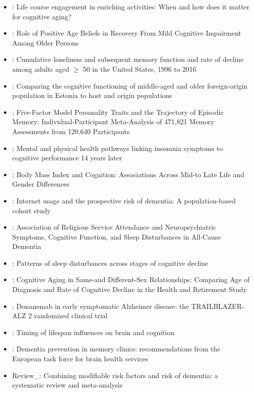 \documentclass[12pt]{article}
\begin{document}
\begin{itemize}
\begin{itemize}
        \item \cite{frank2023life}: Life course engagement in enriching activities: When and how does it matter for cognitive aging?
        \item \cite{levy2023role}: Role of Positive Age Beliefs in Recovery From Mild Cognitive Impairment Among Older Persons
        \item \cite{yu2023cumulative}: Cumulative loneliness and subsequent memory function and rate of decline among adults aged $\geq$ 50 in the United States, 1996 to 2016
        \item \cite{Abuladze2023ComparingTC}: Comparing the cognitive functioning of middle-aged and older foreign-origin population in Estonia to host and origin populations
        \item \cite{sutin2023five}: Five-Factor Model Personality Traits and the Trajectory of Episodic Memory: Individual-Participant Meta-Analysis of 471,821 Memory Assessments from 120,640 Participants
        \item \cite{zaheed2023mental}: Mental and physical health pathways linking insomnia symptoms to cognitive performance 14 years later
        \item \cite{crane2023body}: Body Mass Index and Cognition: Associations Across Mid-to Late Life and Gender Differences
        \item \cite{cho2023internet}: Internet usage and the prospective risk of dementia: A population‐based cohort study
        \item \cite{britt2023association}: Association of Religious Service Attendance and Neuropsychiatric Symptoms, Cognitive Function, and Sleep Disturbances in All-Cause Dementia
        \item \cite{gallagher2023patterns}: Patterns of sleep disturbances across stages of cognitive decline
        \item \cite{hanes2023cognitive}: Cognitive Aging in Same-and Different-Sex Relationships: Comparing Age of Diagnosis and Rate of Cognitive Decline in the Health and Retirement Study
        \item \cite{sims2023donanemab}: Donanemab in early symptomatic Alzheimer disease: the TRAILBLAZER-ALZ 2 randomized clinical trial
        \item \cite{walhovd2023timing}: Timing of lifespan influences on brain and cognition
        \item \cite{frisoni2023dementia}: Dementia prevention in memory clinics: recommendations from the European task force for brain health services
        \item Review\_\cite{peters2019combining}: Combining modifiable risk factors and risk of dementia: a systematic review and meta-analysis
    \end{itemize}
\end{itemize}
\end{document}
